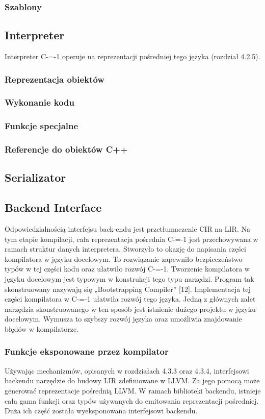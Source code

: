 \subsubsection{Szablony}

\subsection{Interpreter}
Interpreter C-=-1 operuje na reprezentacji pośredniej tego języka (rozdział 4.2.5).
\subsubsection{Reprezentacja obiektów}
\subsubsection{Wykonanie kodu}
\subsubsection{Funkcje specjalne}
\subsubsection{Referencje do obiektów C++}
\subsection{Serializator}
\subsection{Backend Interface}
Odpowiedzialnością interfejsu back-endu jest przetłumaczenie CIR na LIR. Na tym etapie kompilacji, cała reprezentacja pośrednia C-=-1 jest przechowywana w ramach struktur danych interpretera. Stworzyło to okazję do napisania części kompilatora w języku docelowym.
To rozwiązanie zapewniło bezpieczeństwo typów w tej części kodu oraz ułatwiło rozwój C-=-1. Tworzenie kompilatora w języku docelowym jest typowym w konstrukcji tego typu narzędzi. Program tak skonstruowany nazywają się „Bootstrapping Compiler” [12]. 
Implementacja tej części kompilatora w C-=-1 ułatwiła rozwój tego języka. Jedną z głównych zalet narzędzia skonstruowanego w ten sposób jest istnienie dużego projektu w języku docelowym. Wymusza to szybszy rozwój języka oraz umożliwia znajdowanie błędów w kompilatorze.
\subsubsection{Funkcje eksponowane przez kompilator}
Używając mechanizmów, opisanych w rozdziałach 4.3.3 oraz 4.3.4, interfejsowi backendu narzędzie do budowy LIR zdefiniowane w LLVM. Za jego pomocą może generować reprezentacje pośrednią LLVM.
W ramach biblioteki backendu, istnieje cała gama funkcji oraz typów używanych do emitowania reprezentacji pośredniej. Duża ich część została wyeksponowana interfejsowi backendu.

